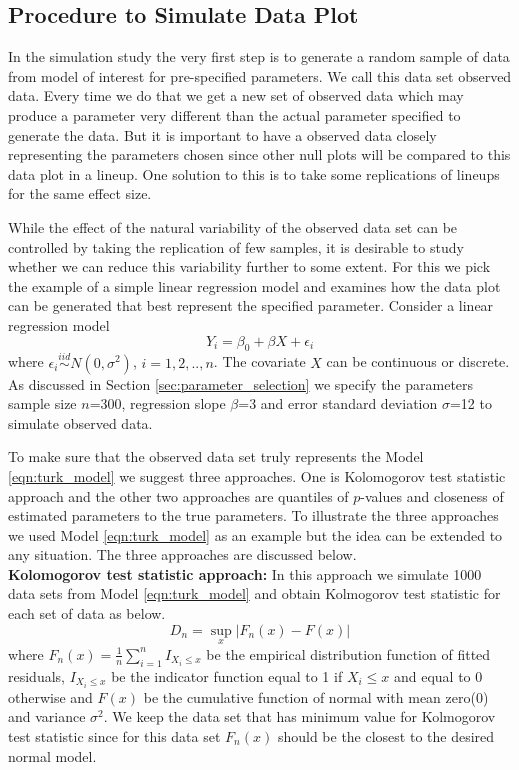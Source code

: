 \documentclass[11pt]{article}
\begin{document}
\subsection{Procedure to Simulate Data Plot} \label{sec:simulate_plot} In the simulation study the very first step is to generate a random sample of data from model of interest for pre-specified parameters. We call this data set observed data. Every time we do that we get a new set of observed data which may produce a parameter very different than the actual parameter specified to generate the data. But it is important to have a observed data closely representing the parameters chosen since other null plots will be compared to this data plot in a lineup. One solution to this is to take some replications of lineups for the same effect size. 

While the effect of the natural variability of the observed data set can be controlled by taking the replication of few samples, it is desirable to study whether we can reduce this variability further to some extent. For this we pick the example of a simple linear regression model and examines how the data plot can be generated that best represent the specified parameter.  Consider a linear regression model 
\begin{equation} \label{eqn:turk_model} 
Y_i = \beta_0 + \beta X  + \epsilon_i 
\end{equation}
where $\epsilon_i \stackrel{iid}{ \sim } N(0,\sigma^2)$, $i=1,2, .., n$. The covariate $X$ can be continuous or discrete. As discussed in Section \ref{sec:parameter_selection} we specify the parameters sample size $n$=300, regression slope $\beta$=3 and error standard deviation $\sigma$=12 to simulate observed data.

To make sure that the observed data set truly represents the Model \eqref{eqn:turk_model} we suggest three approaches. One is Kolomogorov test statistic approach and the other two approaches are quantiles of $p$-values and closeness of estimated parameters to the true parameters. To illustrate the three approaches we used Model \eqref{eqn:turk_model} as an example but the idea can be extended to any situation. The three approaches are discussed below. \\

{\bf Kolomogorov test statistic approach:} In this approach we simulate 1000 data sets from Model \eqref{eqn:turk_model}  and obtain Kolmogorov test statistic for each set of data as below. $$D_n=\sup_x |F_n(x)-F(x)|$$ where $F_n(x)=\frac1n \sum_{i=1}^n I_{X_i\le x}$ be the empirical distribution function of fitted residuals, $I_{X_i\le x}$ be the indicator function equal to 1 if $X_i\le x$ and equal to 0 otherwise and $F(x)$ be the cumulative function of normal with mean zero(0) and variance $\sigma^2$. We keep the data set that has minimum value for Kolmogorov test statistic since for this data set $F_n(x)$ should be the closest to the desired normal model.  \\
\end{document}
